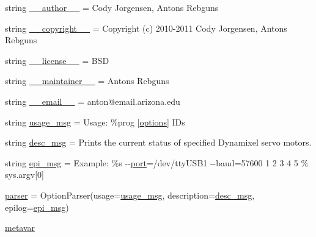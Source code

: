 \begin{DoxyCompactItemize}
\item 
string \hyperlink{namespaceinfo__dump_ad2b2bd739969906b2cd85371c05cce99}{\+\_\+\+\_\+author\+\_\+\+\_\+} = \textquotesingle{}Cody Jorgensen, Antons Rebguns\textquotesingle{}
\item 
string \hyperlink{namespaceinfo__dump_a8af4b6f139eb532c91d84e6354cf060a}{\+\_\+\+\_\+copyright\+\_\+\+\_\+} = \textquotesingle{}Copyright (c) 2010-\/2011 Cody Jorgensen, Antons Rebguns\textquotesingle{}
\item 
string \hyperlink{namespaceinfo__dump_a9a4d843d23e4bf8269008117fd5ef106}{\+\_\+\+\_\+license\+\_\+\+\_\+} = \textquotesingle{}B\+SD\textquotesingle{}
\item 
string \hyperlink{namespaceinfo__dump_adf9a87ae7d1f8fdb12c9856eeefcf52c}{\+\_\+\+\_\+maintainer\+\_\+\+\_\+} = \textquotesingle{}Antons Rebguns\textquotesingle{}
\item 
string \hyperlink{namespaceinfo__dump_aee6a55e46e487213e7bdd1d81c30dc1e}{\+\_\+\+\_\+email\+\_\+\+\_\+} = \textquotesingle{}anton@email.\+arizona.\+edu\textquotesingle{}
\item 
string \hyperlink{namespaceinfo__dump_a90a3cf17b0c24ded2ef387fa67ef7f1e}{usage\+\_\+msg} = \textquotesingle{}Usage\+: \%prog \mbox{[}\hyperlink{namespaceinfo__dump_a7d6b1021261929bba75323767de00e7c}{options}\mbox{]} I\+Ds\textquotesingle{}
\item 
string \hyperlink{namespaceinfo__dump_afa18e188fcfcb13b0f16523f97422078}{desc\+\_\+msg} = \textquotesingle{}Prints the current status of specified Dynamixel servo motors.\textquotesingle{}
\item 
string \hyperlink{namespaceinfo__dump_a20ba822326945097385577b53888d244}{epi\+\_\+msg} = \textquotesingle{}Example\+: \%s -\/-\/\hyperlink{namespaceinfo__dump_a6a0b57c32b7abb158439bb4e8b370c45}{port}=/dev/tty\+U\+S\+B1 -\/-\/baud=57600 1 2 3 4 5\textquotesingle{} \% sys.\+argv\mbox{[}0\mbox{]}
\item 
\hyperlink{namespaceinfo__dump_a4b2573b90a51048b077f2b1909886483}{parser} = Option\+Parser(usage=\hyperlink{namespaceinfo__dump_a90a3cf17b0c24ded2ef387fa67ef7f1e}{usage\+\_\+msg}, description=\hyperlink{namespaceinfo__dump_afa18e188fcfcb13b0f16523f97422078}{desc\+\_\+msg}, epilog=\hyperlink{namespaceinfo__dump_a20ba822326945097385577b53888d244}{epi\+\_\+msg})
\item 
\hyperlink{namespaceinfo__dump_a93b0fee6570e26a997d0deaf338fbec5}{metavar}
\item 

\end{DoxyCompactItemize}
